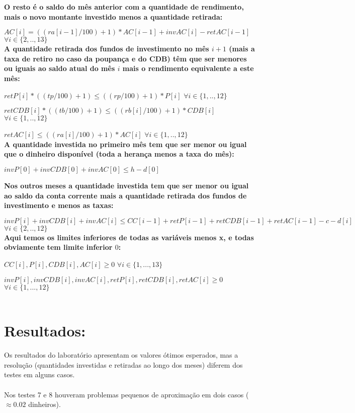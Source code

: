 \documentclass[12pt,a4paper]{article}
\begin{document}
\textbf{O resto é o saldo do mês anterior com a quantidade de rendimento, mais o novo montante investido menos a quantidade retirada:}

$ AC[i] = ((ra[i-1]/100)+1)*AC[i-1] + invAC[i] - retAC[i-1]$ $\forall i \in \{2,..,13\}$\\


\textbf{A quantidade retirada dos fundos de investimento no mês $i+1$ (mais a taxa de retiro no caso da poupança e do CDB) têm que ser menores ou iguais ao saldo atual do mês $i$ mais o rendimento equivalente a este mês:}

$ retP[i]*((tp/100)+1) \leq ((rp/100)+1)*P[i]$ $\forall i \in \{1,..,12\}$

$ retCDB[i]*((tb/100)+1) \leq ((rb[i]/100)+1)*CDB[i]$ $\forall i \in \{1,..,12\}$

$ retAC[i] \leq ((ra[i]/100)+1)*AC[i]$ $\forall i \in \{1,..,12\}$\\


\textbf{A quantidade investida no primeiro mês tem que ser menor ou igual que o dinheiro disponível (toda a herança menos a taxa do mês):}

$ invP[0] + invCDB[0] + invAC[0] \leq h - d[0] $

\textbf{Nos outros meses a quantidade investida tem que ser menor ou igual ao saldo da conta corrente mais a quantidade retirada dos fundos de investimento e menos as taxas:}

$ invP[i] + invCDB[i] + invAC[i] \leq CC[i-1] + retP[i-1] + retCDB[i-1] + retAC[i-1] - c - d[i]$ $\forall i \in \{2,..,12\}$\\


\textbf{Aqui temos os limites inferiores de todas as variáveis menos x, e todas obviamente tem limite inferior $0$:}

$ CC[i],P[i],CDB[i],AC[i] \geq 0$ $\forall i \in \{1,...,13\} $

$ invP[i],invCDB[i],invAC[i],retP[i],retCDB[i],retAC[i] \geq 0$ $\forall i \in \{1,...,12\} $\\\\


\section{Resultados:}

Os resultados do laboratório apresentam os valores ótimos esperados, mas a resolução (quantidades investidas e retiradas ao longo dos meses) diferem dos testes em alguns casos.\\\\
Nos testes 7 e 8 houveram problemas pequenos de aproximação em dois casos ($\approx 0.02$ dinheiros).
\end{document}
